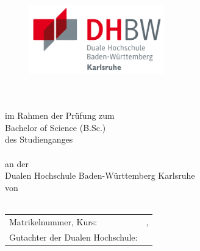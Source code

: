 \thispagestyle{empty}
\begin{titlepage}
\enlargethispage{4cm}

\begin{figure}           %
	 \vspace*{-10mm} %

	\begin{minipage}{0.49\textwidth}
		\flushleft
		\includegraphics[height=3cm]{Bilder/Logos/Logo_DHBW.pdf} 
	\end{minipage}
	\hfill
\end{figure} 
\vspace*{0.2cm}

\begin{center}
	\huge{\textbf{\titel}}\\[1cm]
	\Large{\textbf{\arbeit}}\\[0.5cm]
	\normalsize{im Rahmen der Prüfung zum} \\[0.2cm] 
	\Large{Bachelor of Science (B.Sc.)}\\[0.2cm]
	\normalsize{des Studienganges} \\ [0.2cm]
	\Large{\studiengang}\\[1ex]
	\normalsize{an der} \\ [0.2cm]
	\Large{Dualen Hochschule Baden-Württemberg Karlsruhe}\\[0.2cm]
	\normalsize{von}\\[0.5cm] \Large{\textbf{\autor}} \\
\end{center}

\begin{center}
	\vfill
	\begin{tabular}{ll}
		Matrikelnummer, Kurs:            & \matrikelnr , \kurs \\[0.2cm]
		Gutachter der Dualen Hochschule: & \betreuerDhbw \\[4cm]
	\end{tabular} 
\end{center}
\end{titlepage}
